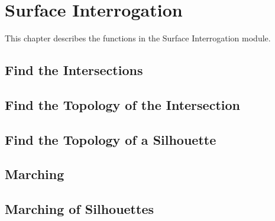 \chapter{Surface Interrogation}
\label{surfaceinterrogation}
This chapter describes the functions in the Surface Interrogation module.


\pgsbreak

\section{Find the Intersections}

\pgsbreak

\pgsbreak

\pgsbreak

\pgsbreak

\pgsbreak

\pgsbreak

\pgsbreak

\pgsbreak

\pgsbreak

\pgsbreak

\pgsbreak

\pgsbreak
\section{Find the Topology of the Intersection}

\pgsbreak

\pgsbreak

\pgsbreak

\pgsbreak

\pgsbreak

\pgsbreak

\pgsbreak
\section{Find the Topology of a Silhouette}

\pgsbreak

\pgsbreak

\pgsbreak
\section{Marching}

\pgsbreak

\pgsbreak

\pgsbreak

\pgsbreak

\pgsbreak

\pgsbreak

\pgsbreak
\section{Marching of Silhouettes}

\pgsbreak

\pgsbreak

\pgsbreak

\pgsbreak

\pgsbreak

